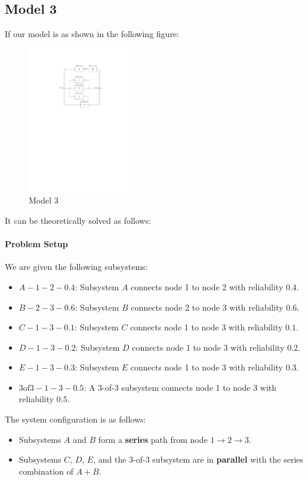 \documentclass[12pt	]{article}
\begin{document}
\subsection{Model 3}
If our model is as shown in the following figure:

\begin{figure}[h]
	\centering
	\includegraphics[width=0.4\textwidth]{Images/img4.pdf}
	\caption{Model 3}
	\label{fig:Model 3}
\end{figure}

It can be theoretically solved as follows:

\paragraph{Problem Setup}
We are given the following subsystems:
\begin{itemize}
	\item $A-1-2-0.4$: Subsystem $A$ connects node 1 to node 2 with reliability $0.4$.
	\item $B-2-3-0.6$: Subsystem $B$ connects node 2 to node 3 with reliability $0.6$.
	\item $C-1-3-0.1$: Subsystem $C$ connects node 1 to node 3 with reliability $0.1$.
	\item $D-1-3-0.2$: Subsystem $D$ connects node 1 to node 3 with reliability $0.2$.
	\item $E-1-3-0.3$: Subsystem $E$ connects node 1 to node 3 with reliability $0.3$.
	\item $3\text{of}3-1-3-0.5$: A $3$-of-$3$ subsystem connects node 1 to node 3 with reliability $0.5$.
\end{itemize}

The system configuration is as follows:
\begin{itemize}
	\item Subsystems $A$ and $B$ form a \textbf{series} path from node $1 \to 2 \to 3$.
	\item Subsystems $C$, $D$, $E$, and the $3$-of-$3$ subsystem are in \textbf{parallel} with the series combination of $A+B$.
\end{itemize}
\end{document}
